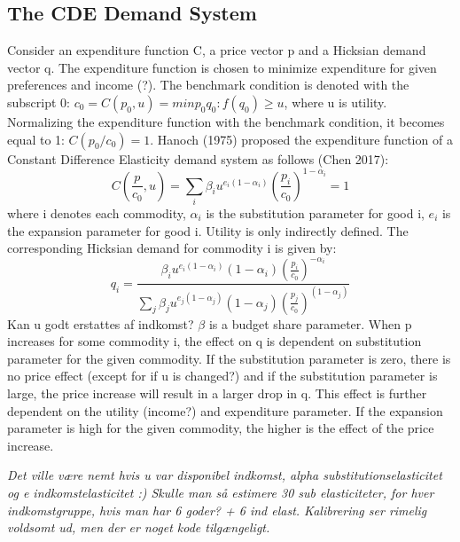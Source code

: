 \subsection{The CDE Demand System}
Consider an expenditure function C, a price vector p and a Hicksian demand vector q. The expenditure function is chosen to minimize expenditure for given preferences and income (?). The benchmark condition is denoted with the subscript 0: \(c_0=C(p_0,u)={min p_0q_0:f(q_0)\geq u}\), where u is utility. Normalizing the expenditure function with the benchmark condition, it becomes equal to 1: \(C(p_0/c_0)=1\). Hanoch (1975) proposed the expenditure function of a Constant Difference Elasticity demand system as follows (Chen 2017): 
\begin{equation}
    C(\frac{p}{c_0},u)=\sum_i\beta_i u^{e_i (1-\alpha_i)} (\frac{p_i}{c_0})^{1-\alpha_i}=1
\end{equation}
where i denotes each commodity, \(\alpha_i\) is the substitution parameter for good i, \(e_i\) is the expansion parameter for good i. Utility is only indirectly defined. 
The corresponding Hicksian demand for commodity i is given by: 
\begin{equation}
q_i=\frac{\beta_i u^{e_i(1-\alpha_i)}(1-\alpha_i)(\frac{p_i}{c_0})^{-\alpha_i}}{\sum_j\beta_j u^{e_j (1-\alpha_j)}(1-\alpha_j)(\frac{p_j}{c_0})^{(1-\alpha_j)}}
\end{equation}Kan u godt erstattes af indkomst? \(\beta\) is a budget share parameter. When p increases for some commodity i, the effect on q is dependent on substitution parameter for the given commodity. If the substitution parameter is zero, there is no price effect (except for if u is changed?) and if the substitution parameter is large, the price increase will result in a larger drop in q. This effect is further dependent on the utility (income?) and expenditure parameter. If the expansion parameter is high for the given commodity, the higher is the effect of the price increase.

\textit{Det ville være nemt hvis u var disponibel indkomst, alpha substitutionselasticitet og e indkomstelasticitet :)
Skulle man så estimere 30 sub elasticiteter, for hver indkomstgruppe, hvis man har 6 goder?
+ 6 ind elast. 
Kalibrering ser rimelig voldsomt ud, men der er noget kode tilgængeligt.}

